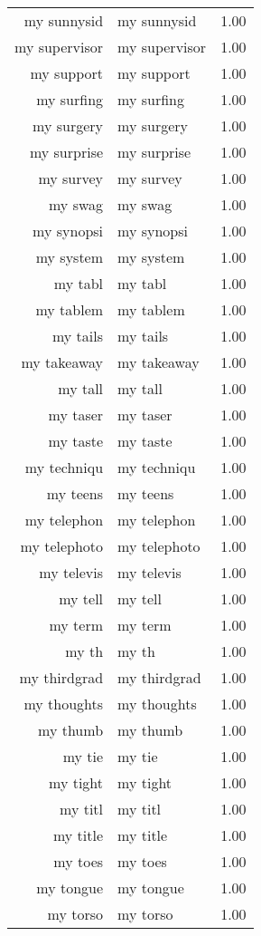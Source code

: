\begin{table}[ht]
\begin{tabular}{rlr}
  my sunnysid & my sunnysid & 1.00 \\ 
  my supervisor & my supervisor & 1.00 \\ 
  my support & my support & 1.00 \\ 
  my surfing & my surfing & 1.00 \\ 
  my surgery & my surgery & 1.00 \\ 
  my surprise & my surprise & 1.00 \\ 
  my survey & my survey & 1.00 \\ 
  my swag & my swag & 1.00 \\ 
  my synopsi & my synopsi & 1.00 \\ 
  my system & my system & 1.00 \\ 
  my tabl & my tabl & 1.00 \\ 
  my tablem & my tablem & 1.00 \\ 
  my tails & my tails & 1.00 \\ 
  my takeaway & my takeaway & 1.00 \\ 
  my tall & my tall & 1.00 \\ 
  my taser & my taser & 1.00 \\ 
  my taste & my taste & 1.00 \\ 
  my techniqu & my techniqu & 1.00 \\ 
  my teens & my teens & 1.00 \\ 
  my telephon & my telephon & 1.00 \\ 
  my telephoto & my telephoto & 1.00 \\ 
  my televis & my televis & 1.00 \\ 
  my tell & my tell & 1.00 \\ 
  my term & my term & 1.00 \\ 
  my th & my th & 1.00 \\ 
  my thirdgrad & my thirdgrad & 1.00 \\ 
  my thoughts & my thoughts & 1.00 \\ 
  my thumb & my thumb & 1.00 \\ 
  my tie & my tie & 1.00 \\ 
  my tight & my tight & 1.00 \\ 
  my titl & my titl & 1.00 \\ 
  my title & my title & 1.00 \\ 
  my toes & my toes & 1.00 \\ 
  my tongue & my tongue & 1.00 \\ 
  my torso & my torso & 1.00 \\ 

\end{tabular}
\end{table}
